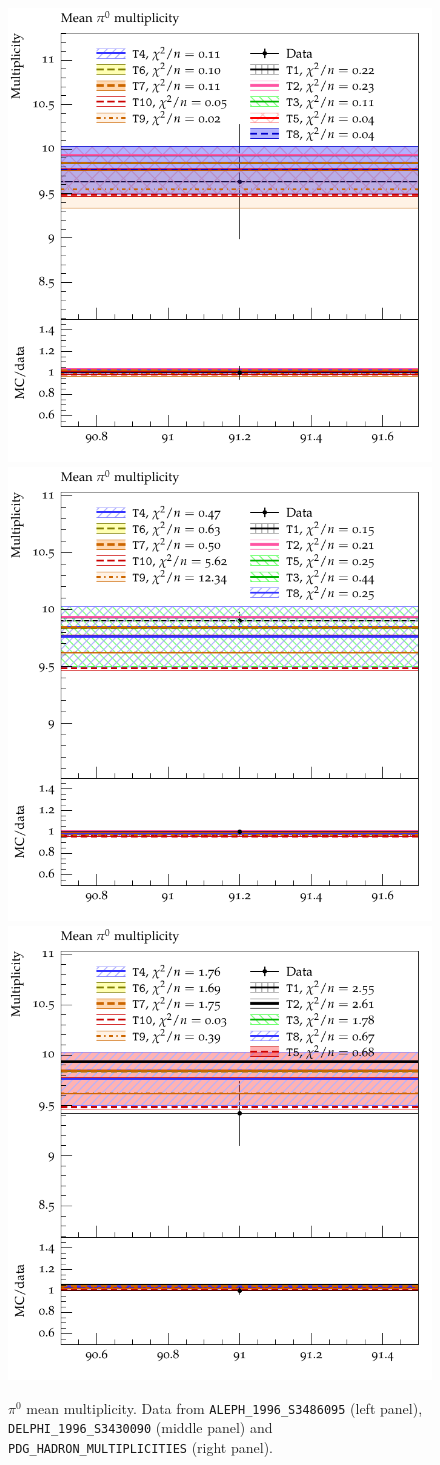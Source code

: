 \documentclass[aps,preprint,floatfix,nofootinbib,showpacs]{revtex4-1}
\begin{document}
\begin{figure}[!h]
 \centering
 \includegraphics[width=0.47\linewidth]{Figures/Mean_multiplicities/ALEPH_1996_S3486095_d44-x01-y02.pdf}
 \hfill
 \includegraphics[width=0.47\linewidth]{Figures/Mean_multiplicities/DELPHI_1996_S3430090_d36-x01-y02.pdf}
\hfill
\includegraphics[width=0.47\linewidth]{Figures/Mean_multiplicities/PDG_HADRON_MULTIPLICITIES_d02-x01-y03.pdf}
\caption{$\pi^0$ mean multiplicity. Data from \texttt{ALEPH\_1996\_S3486095} \cite{Barate:1996fi} (left
panel), \texttt{DELPHI\_1996\_S3430090} \cite{Abreu:1996na} (middle panel)
and \texttt{PDG\_HADRON\_MULTIPLICITIES} \cite{Amsler:2008zzb} (right panel).}
\label{Fig.23}
\end{figure}
\end{document}
